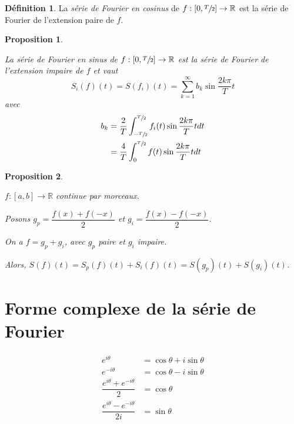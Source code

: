 \documentclass{report}
\newcommand*{\dsum}[4]{\displaystyle\sum_{#1=#2}^{#3}#4}
\newcommand*{\dint}[3]{\displaystyle\int_{#1}^{#2}#3}
\newcommand*{\reels}{\mathbb{R}}
\newtheorem*{prop}{Proposition}
\theoremstyle{definition}
\newtheorem*{defin}{D\'efinition}
\theoremstyle{remark}
\begin{document}
	\begin{defin}
		La \emph{s\'erie de Fourier en cosinus} de $f:[0,\sfrac{T}{2}] \to \reels$ est la s\'erie de Fourier de l'extension paire de $f$.
	\end{defin}
	\begin{prop}~

		La \emph{s\'erie de Fourier en sinus} de $f:[0,\sfrac{T}{2}] \to \reels$ est la s\'erie de Fourier de l'extension impaire de $f$ et vaut
		\begin{equation*}
			S_i(f)(t) = S(f_i)(t) = \dsum{k}{1}{\infty}{b_k\sin\dfrac{2k\pi}{T}t}
		\end{equation*}
		avec
		\begin{align*}
			b_k&= \dfrac{2}{T} \dint{-\sfrac{T}{2}}{\sfrac{T}{2}}{f_i(t) \sin\dfrac{2k\pi}{T}t dt}\\
			&= \dfrac{4}{T} \dint{0}{\sfrac{T}{2}}{f(t) \sin\dfrac{2k\pi}{T}t dt}
		\end{align*}
	\end{prop}
	\begin{prop}~

		$f:[a,b] \to \reels$ continue par morceaux.

		Posons $g_p = \dfrac{f(x)+f(-x)}{2}$ et $g_i = \dfrac{f(x)-f(-x)}{2}$.

		On a $f = g_p+g_i$, avec $g_p$ paire et $g_i$ impaire.

		Alors, $S(f)(t) = S_p(f)(t) + S_i(f)(t) = S(g_p)(t) + S(g_i)(t)$.
	\end{prop}

	\section{Forme complexe de la s\'erie de Fourier}
	\begin{align*}
		e^{i\theta}&= \cos\theta+i\sin\theta\\
		e^{-i\theta}&= \cos\theta-i\sin\theta\\[1ex]
		\dfrac{e^{i\theta}+e^{-i\theta}}{2}&= \cos\theta\\
		\dfrac{e^{i\theta}-e^{-i\theta}}{2i}&= \sin\theta
	\end{align*}
\end{document}
